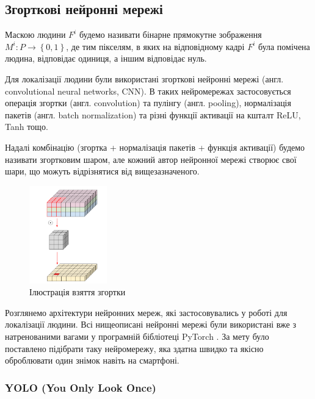\subsection{Згорткові нейронні мережі}

\begin{definition}
    Маскою людини \(F^{i}\) будемо називати бінарне прямокутне
    зображення \(M^{i}:P \rightarrow \left\{ 0,1 \right\}\), де тим
    пікселям, в яких на відповідному кадрі \(F^{i}\) була помічена людина,
    відповідає одиниця, а іншим відповідає нуль.
\end{definition}
Для локалізації людини були використані згорткові нейронні мережі
(англ. convolutional neural networks, CNN).
В таких нейромережах застосовується операція згортки (англ. convolution)
та пулінгу (англ. pooling), нормалізація пакетів (англ. batch normalization)
та різні функції активації на кшталт ReLU, Tanh тощо.

Надалі комбінацію (згортка + нормалізація пакетів + функція активації)
будемо називати згортковим шаром, але кожний автор нейронної мережі
створює свої шари, що можуть відрізнятися від вищезазначеного.

\begin{figure}[H]
    \centering
    \includegraphics[width=0.3\textwidth]{images/cnn_conv_operation}
    \caption{Ілюстрація взяття згортки  \cite{deep_wise_sep_conv_website}
        \label{fig:cnn:conv_operation}
    }
\end{figure}

Розглянемо архітектури нейронних мереж, які застосовувались у роботі
для локалізації людини. Всі нищеописані нейронні мережі були використані вже з
натренованими вагами у програмній бібліотеці PyTorch \cite{pytorch_library}.
За мету було поставлено підібрати таку нейромережу, яка здатна швидко та якісно оброблювати
один знімок навіть на смартфоні.

\subsubsection{YOLO (You Only Look Once)}

